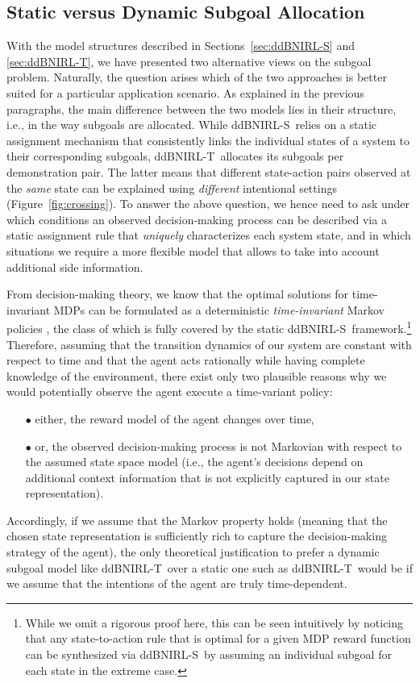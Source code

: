 \documentclass[twoside,11pt]{article}
\newcommand{\ie}{i.e.}
\newcommand{\ddBNIRLS}{\mbox{ddBNIRL-S}}
\newcommand{\ddBNIRLT}{\mbox{ddBNIRL-T}}
\begin{document}
\subsection{Static versus Dynamic Subgoal Allocation}
\label{sec:staticVSdynamic}
With the model structures described in Sections~\ref{sec:ddBNIRL-S} and \ref{sec:ddBNIRL-T}, we have presented two alternative views on the subgoal problem. Naturally, the question arises which of the two approaches %
is better suited for a particular application scenario. 
%
%
As explained in the previous paragraphs, the main difference between the two models lies in their structure, \ie, in the way subgoals are allocated. While \ddBNIRLS\ relies on a static assignment mechanism that consistently links the individual states of a system to their corresponding subgoals, \ddBNIRLT\ allocates its subgoals per demonstration pair. The latter means that different state-action pairs observed at the \textit{same} state can be explained %
%
using \textit{different} intentional %
settings (Figure~\ref{fig:crossing}). 
%
%
To answer the above question, we hence need to ask %
%
under which conditions an observed decision-making process can be described via a static assignment rule that \textit{uniquely} characterizes each system state, %
and in which situations %
we require a more flexible model that allows to take into account additional %
side information. %

%
%
%

From decision-making theory, we know that the optimal solutions for time-invariant MDPs can be formulated as a deterministic \textit{time-invariant} Markov policies \citep{puterman1994}, %
the class of which is fully covered by the static \ddBNIRLS\ framework.\footnote{While we omit a rigorous proof here, this can be seen intuitively by noticing that any state-to-action rule that is optimal for a given MDP reward function can be synthesized via \ddBNIRLS\ by %
assuming an individual subgoal for each state in the extreme case.} Therefore, assuming that the transition dynamics of our system are constant with respect to time and that the agent acts rationally while having complete knowledge of the environment, %
there exist only two plausible reasons why %
we would potentially observe the agent execute a time-variant policy:
\begin{enumerate}[topsep=-\parskip+1ex, itemsep=0ex, parsep=0mm]
\item[$\bullet$] either, the reward model of the agent changes over time,
\item[$\bullet$] or, the observed decision-making process %
is not Markovian with respect to the assumed state space model (\ie, the agent's decisions depend on additional context information that is not explicitly captured in our state representation).
\end{enumerate}
Accordingly, if we assume that the Markov property holds (meaning that the chosen state representation is sufficiently rich to capture the decision-making strategy of the agent), %
the only theoretical justification to prefer a dynamic subgoal model like \ddBNIRLT\ over a static one such as \ddBNIRLT\ would be if %
we assume that the intentions of the agent are truly 
time-dependent.
\end{document}
